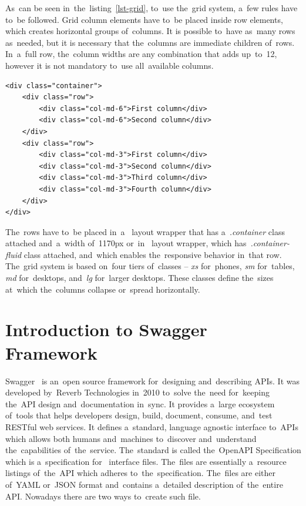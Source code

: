 As~can be seen in~the~listing~\ref{lst-grid}, to~use the~grid system, a~few rules have to~be followed. Grid column elements
have to~be placed inside row elements, which creates horizontal groups
of~columns. It is possible to~have as~many rows as~needed, but it is necessary
that the~columns are immediate children of~rows. In~a~full row, the~column
widths are any combination that adds up~to~12, however it is not mandatory
to~use all~available columns.

\vspace{1mm}
\begin{lstlisting}[caption=An~illustration of~the~grid system in~PatternFly.,
label=lst-grid, style=dp-html]
<div class="container">
	<div class="row">
		<div class="col-md-6">First column</div>
		<div class="col-md-6">Second column</div>
	</div>
	<div class="row">
		<div class="col-md-3">First column</div>
		<div class="col-md-3">Second column</div>
		<div class="col-md-3">Third column</div>
		<div class="col-md-3">Fourth column</div>
	</div>
</div>
\end{lstlisting}

The~rows have to~be placed in~a~ layout wrapper that has
a~\textit{.container} class attached and~a~width of~1170px or~in~
layout wrapper, which has~\textit{.container-fluid} class attached, and~which
enables the~responsive behavior in~that row. The~grid system is based on~four
tiers of~classes -- \textit{xs} for~phones, \textit{sm} for~tables, \textit{md}
for~desktops, and~\textit{lg} for~larger desktops. These classes define
the~sizes at~which the~columns collapse or~spread horizontally. 


\section{Introduction to Swagger Framework}
Swagger~\cite{Swagger} is an~open source framework for~designing and~describing
APIs. It was developed by~Reverb Technologies in~2010 to~solve the~need
for~keeping the~API design and~documentation in~sync. It provides a~large
ecosystem of~tools that helps developers design, build, document, consume,
and~test RESTful web services. It defines a~standard, language agnostic
interface to~APIs which allows both humans and~machines to~discover
and~understand the~capabilities of~the~service. The~standard is called
the~OpenAPI Specification which is a~specification for~
interface files. The~files are essentially a~resource listings of~the~API which
adheres to~the~specification. The~files are either of~YAML or~JSON format
and~contains a~detailed description of~the~entire API. Nowadays there are two
ways to~create such file.

